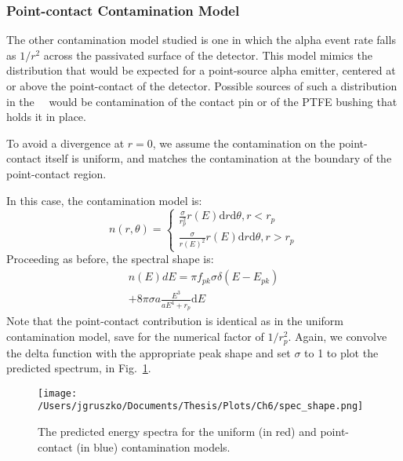 \subsubsection{Point-contact Contamination Model}
The other contamination model studied is one in which the alpha event rate falls as $1/r^2$ across the passivated surface of the detector. This model mimics the distribution that would be expected for a point-source alpha emitter, centered at or above the point-contact of the detector. Possible sources of such a distribution in the \MJ\ \DEM\ would be contamination of the contact pin or of the PTFE bushing that holds it in place. 

To avoid a divergence at $r=0$, we assume the contamination on the point-contact itself is uniform, and matches the contamination at the boundary of the point-contact region. 

In this case, the contamination model is:
$$n(r, \theta)=
\begin{cases}
\frac{\sigma}{r_p^2} r(E) \mathrm{d}r \mathrm{d}\theta, r<r_p \\
\frac{\sigma}{r(E)^2} r(E) \mathrm{d}r \mathrm{d}\theta, r>r_p
\end{cases}
$$
Proceeding as before, the spectral shape is:
\begin{equation}
\begin{split}
n(E)dE = \pi f_{pk}\sigma\delta(E-E_{pk}) \\
+ 8\pi \sigma a \frac{E^3}{aE^4+r_p} \mathrm{d}E
\end{split}
\end{equation}
Note that the point-contact contribution is identical as in the uniform contamination model, save for the numerical factor of $1/r_p^2$. Again, we convolve the delta function with the appropriate peak shape and set $\sigma$ to 1 to plot the predicted spectrum, in Fig.~\ref{fig:spec_shape}. 

\begin{figure}[]
 \centering
 \texttt{[image: /Users/jgruszko/Documents/Thesis/Plots/Ch6/spec\_shape.png]}
 \caption[The predicted energy spectra for the uniform and point-contact contamination models]{The predicted energy spectra for the uniform (in red) and point-contact (in blue) contamination models.} 
 \label{fig:spec_shape}
\end{figure}

